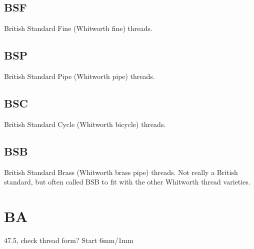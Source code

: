\subsection{BSF}
British Standard Fine (Whitworth fine) threads.
\clearpage

\subsection{BSP}
British Standard Pipe (Whitworth pipe) threads.
\clearpage

\subsection{BSC}
British Standard Cycle (Whitworth bicycle) threads.
\clearpage

\subsection{BSB}
British Standard Brass (Whitworth brass pipe) threads.  Not really a British standard, but often called BSB to fit with the other Whitworth thread varieties.
\clearpage

\clearpage
\section{BA}
47.5\degree, check thread form?
Start 
6mm/1mm
\\ \\ \\ \\ \\ \\ \\ \\ \\ \\ \\ \\ \\ \\ \\ \\ \\ \\               
                                                                                                                   
\clearpage
